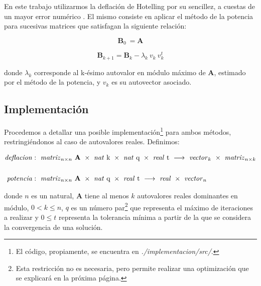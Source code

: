 En este trabajo utilizarmos la deflación de Hotelling por su sencillez, a cuestas de un mayor error numérico \cite{Burden}. El mismo consiste en aplicar el método de la potencia para sucesivas matrices que satisfagan la siguiente relación:

\vspace{1em}
\begin{equation*}
    \mathbf{B}_0\ = \mathbf{A}
\end{equation*}

\begin{equation} \label{deflacion}
    \mathbf{B}_{k+1} = \mathbf{B}_{k} - \lambda_k\ v_k\ v_k^t 
\end{equation}

\vspace{1em}
\noindent donde $\lambda_k$ corresponde al k-ésimo autovalor en módulo máximo de \textbf{A}, estimado por el método de la potencia, y $v_k$ es su autovector asociado.






\vspace{2em}
\subsection{Implementación} Procedemos a detallar una posible implementación\footnote{El código, propiamente, se encuentra en \textit{./implementacion/src/}.} para ambos métodos, restringiéndonos al caso de autovalores reales. Definimos:

\begin{align*}
    \text{\textit{deflacion}}&:\ \text{\textit{matriz}}_{n \times n}\ \mathbf{A}\ \times\ \text{\textit{nat} k}\ \times\ \text{\textit{nat} q}\ \times\ \text{\textit{real} t}\
    \longrightarrow\ \text{\textit{vector}}_k\ \times\ \text{\textit{matriz}}_{n \times k}
    \\ \\
    \text{\textit{potencia}}&:\ \text{\textit{matriz}}_{n \times n}\ \mathbf{A}\ \times\ \text{\textit{nat} q}\ \times\ \text{\textit{real} t}\ 
    \longrightarrow\ \text{\textit{real}}\ \times\ \text{\textit{vector}}_n
\end{align*}

\vspace{1em}
\noindent donde $n$ es un natural, \textbf{A} tiene al menos $k$ autovalores reales dominantes en módulo, $0 < k \leq n$, $q$ es un número par\footnote{Esta restricción no es necesaria, pero permite realizar una optimización que se explicará en la próxima página.} que representa el máximo de iteraciones a realizar y $0 \leq t$ representa la tolerancia mínima a partir de la que se considera la convergencia de una solución. 

